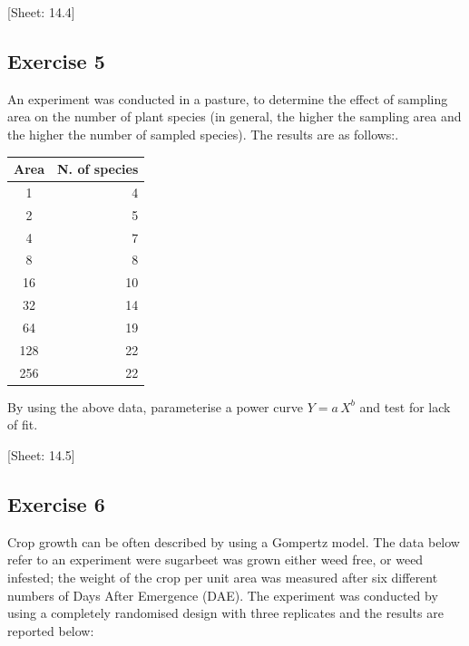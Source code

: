\documentclass[a4paper,12pt,oneside]{book}
\begin{document}
{[}Sheet: 14.4{]}

\hypertarget{exercise-5-3}{%
\subsection{Exercise 5}\label{exercise-5-3}}

An experiment was conducted in a pasture, to determine the effect of sampling area on the number of plant species (in general, the higher the sampling area and the higher the number of sampled species). The results are as follows:.

\begin{longtable}[]{@{}cr@{}}
\toprule()
Area & N. of species \\
\midrule()
\endhead
1 & 4 \\
2 & 5 \\
4 & 7 \\
8 & 8 \\
16 & 10 \\
32 & 14 \\
64 & 19 \\
128 & 22 \\
256 & 22 \\
\bottomrule()
\end{longtable}

By using the above data, parameterise a power curve \(Y = a \, X^b\) and test for lack of fit.

{[}Sheet: 14.5{]}

\hypertarget{exercise-6-3}{%
\subsection{Exercise 6}\label{exercise-6-3}}

Crop growth can be often described by using a Gompertz model. The data below refer to an experiment were sugarbeet was grown either weed free, or weed infested; the weight of the crop per unit area was measured after six different numbers of Days After Emergence (DAE). The experiment was conducted by using a completely randomised design with three replicates and the results are reported below:
\end{document}
